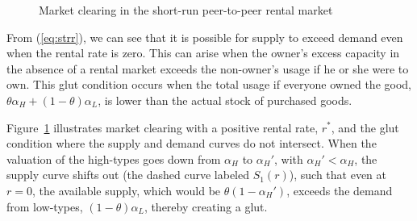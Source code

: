 \documentclass[12pt]{article}
\begin{document}
\newcommand*{\alphaH}{0.80}%
\newcommand*{\alphaL}{0.50}%
\newcommand*{\alphaHp}{0.40}
\pgfmathsetmacro{\r}{-1 + \alphaH + \alphaL}%
\pgfmathsetmacro{\Q}{\alphaL - \r/2}
\begin{figure} 
\caption{Market clearing in the short-run peer-to-peer rental market} 
\label{fig:market_clearing} 
\begin{center}
\end{center}
\end{figure} 

From (\ref{eq:strr}), we can see that it is possible for supply to exceed demand even when the rental rate is zero. 
This can arise when the owner's excess capacity in the absence of a
rental market exceeds the non-owner's usage if he or she were to own. 
This glut condition occurs when the total usage if everyone owned the good, $\theta \alpha_H + (1-\theta)\alpha_L$, is lower than the actual stock of purchased goods. 

Figure~\ref{fig:market_clearing} illustrates market clearing with a positive rental rate, $r^*$, and the glut condition where the supply and demand curves do not intersect.
When the valuation of the high-types goes down from $\alpha_H$ to $\alpha_H'$, with $\alpha_H' < \alpha_H$, the supply curve shifts out (the dashed curve labeled $S_1(r)$), such that even at $r = 0$, the available supply, which would be $\theta (1-\alpha_H')$, exceeds the demand from low-types, $(1-\theta)\alpha_L$, thereby creating a glut.  
\end{document}
